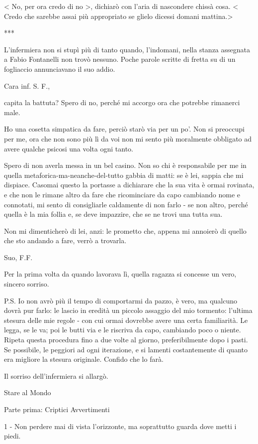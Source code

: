 < No, per ora credo di no >, dichiarò con l'aria di nascondere chissà cosa. < Credo che sarebbe assai più appropriato se glielo dicessi domani mattina.>

***

L'infermiera non si stupì più di tanto quando, l'indomani, nella stanza assegnata a Fabio Fontanelli non trovò nessuno. Poche parole scritte di fretta su di un fogliaccio annunciavano il suo addio.

Cara inf. S. F.,

capita la battuta? Spero di no, perché mi accorgo ora che potrebbe rimanerci male.

Ho una cosetta simpatica da fare, perciò starò via per un po'. Non si preoccupi per me, ora che non sono più lì da voi non mi sento più moralmente obbligato ad avere qualche psicosi una volta ogni tanto.

Spero di non averla messa in un bel casino. Non so chi è responsabile per me in quella metaforica-ma-neanche-del-tutto gabbia di matti: se è lei, sappia che mi dispiace. Casomai questo la portasse a dichiarare che la sua vita è ormai rovinata, e che non le rimane altro da fare che ricominciare da capo cambiando nome e connotati, mi sento di consigliarle caldamente di non farlo - se non altro, perché quella è la mia follia e, se deve impazzire, che se ne trovi una tutta sua.

Non mi dimenticherò di lei, anzi: le prometto che, appena mi annoierò di quello che sto andando a fare, verrò a trovarla.

Suo,
F.F.

Per la prima volta da quando lavorava lì, quella ragazza si concesse un vero, sincero sorriso.

P.S. Io non avrò più il tempo di comportarmi da pazzo, è vero, ma qualcuno dovrà pur farlo: le lascio in eredità un piccolo assaggio del mio tormento: l'ultima stesura delle mie regole - con cui ormai dovrebbe avere una certa familiarità. Le legga, se le va; poi le butti via e le riscriva da capo, cambiando poco o niente. Ripeta questa procedura fino a due volte al giorno, preferibilmente dopo i pasti. Se possibile, le peggiori ad ogni iterazione, e si lamenti costantemente di quanto era migliore la stesura originale. Confido che lo farà.

Il sorriso dell'infermiera si allargò.

Stare al Mondo

Parte prima: Criptici Avvertimenti

1 - Non perdere mai di vista l’orizzonte, ma soprattutto guarda dove metti i piedi.

